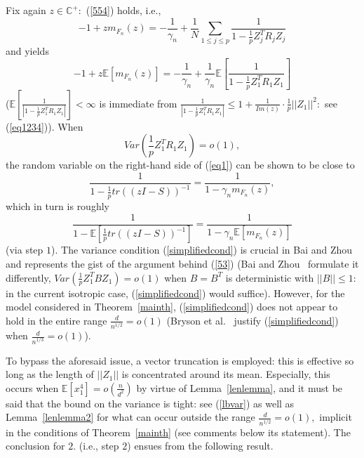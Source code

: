 \documentclass{article}
\numberwithin{equation}{section}
\begin{document}
Fix again \(z \in \mathbb{C}^+:\) (\ref{554}) holds, i.e.,
\[-1+zm_{F_n}(z)=-\frac{1}{\gamma_n}+\frac{1}{N}\sum_{1 \leq j \leq p}{\frac{1}{1-\frac{1}{p}Z_j^TR_jZ_j}}\]
and yields
\begin{equation}\label{eq1}
    -1+z\mathbb{E}[m_{F_n}(z)]=-\frac{1}{\gamma_n}+\frac{1}{\gamma_n}\mathbb{E}[\frac{1}{1-\frac{1}{p}Z_1^TR_1Z_1}]
\end{equation}
(\(\mathbb{E}[\frac{1}{|1-\frac{1}{p}Z_1^TR_1Z_1|}]<\infty\) is immediate from \(\frac{1}{|1-\frac{1}{p}Z_1^TR_1Z_1|} \leq 1+\frac{1}{Im(z)} \cdot \frac{1}{p}||Z_1||^2:\) see (\ref{eq1234})). When
\begin{equation}\label{simplifiedcond}
    Var(\frac{1}{p}Z_1^TR_1Z_1)=o(1),
\end{equation}
the random variable on the right-hand side of (\ref{eq1}) can be shown to be close to 
\[\frac{1}{1-\frac{1}{p}tr((zI-S))^{-1}}=\frac{1}{1-\gamma_nm_{F_n}(z)},\]
which in turn is roughly
\[\frac{1}{1-\mathbb{E}[\frac{1}{p}tr((zI-S))^{-1}]}=\frac{1}{1-\gamma_n\mathbb{E}[m_{F_n}(z)]}\] 
(via step \(1\)). The variance condition (\ref{simplifiedcond}) is crucial in Bai and Zhou~\cite{baizhou} and represents the gist of the argument behind (\ref{53}) (Bai and Zhou~\cite{baizhou} formulate it differently, \(Var(\frac{1}{p}Z_1^TBZ_1)=o(1)\) when \(B=B^T\) is deterministic with \(||B|| \leq 1:\) in the current isotropic case, (\ref{simplifiedcond}) would suffice). However, for the model considered in Theorem~\ref{mainth}, (\ref{simplifiedcond}) does not appear to hold in the entire range \(\frac{d}{n^{1/2}}=o(1)\) (Bryson et al.~\cite{bryson} justify (\ref{simplifiedcond}) when \(\frac{d}{n^{1/3}}=o(1)\)). 
\par
To bypass the aforesaid issue, a vector truncation is employed: this is effective so long as the length of \(||Z_1||\) is concentrated around its mean. Especially, this occurs when \(\mathbb{E}[x_{1}^4]=o(\frac{n}{d^2})\) by virtue of Lemma~\ref{lenlemma}, and it must be said that the bound on the variance is tight: see (\ref{lbvar}) as well as Lemma~\ref{lenlemma2} for what can occur outside the range \(\frac{d}{n^{1/2}}=o(1),\) implicit in the conditions of Theorem~\ref{mainth} (see comments below its statement). %
The conclusion for \(2.\) (i.e., step \(2\)) %
ensues from the following result.
\end{document}

